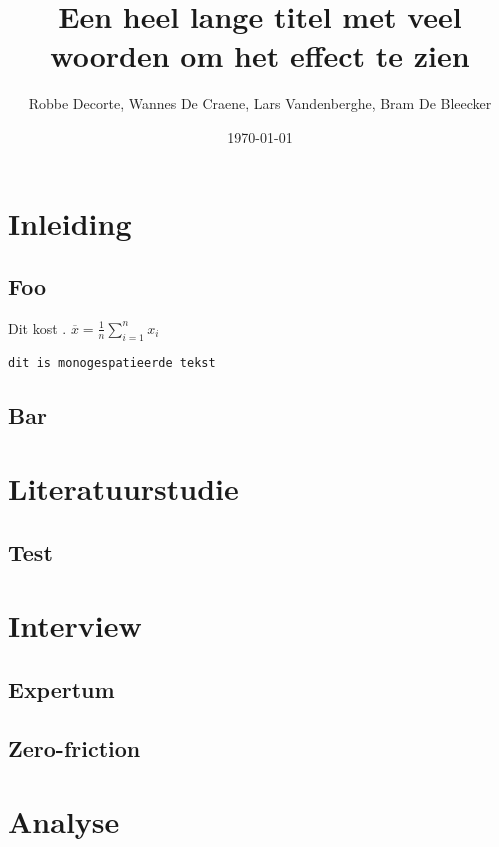 \documentclass{hogent-report}
\title{Een heel lange titel met veel woorden om het effect te zien}
\author{Robbe Decorte, Wannes {De Craene}, Lars Vandenberghe, Bram {De Bleecker}}
\date{\today}
\begin{document}
  \inserttitlepage[hgblue]
  
  \usechapterimagefalse

  \tableofcontents
  
  \chapter{Inleiding}
  
  \lipsum[1]
  
  \section{Foo}
  
  Dit kost . $\overline{x} = \frac{1}{n} \sum_{i = 1}^{n} x_i$
  
  \texttt{dit is monogespatieerde tekst}
  
  \lipsum[2-3]
  
  \section{Bar}
  
  \lipsum[4-6]
  
  \chapter{Literatuurstudie}
  
  \lipsum[7]
  
  \section{Test}
  
  \lipsum[8-10]
  
  \chapter{Interview}
  
  \section{Expertum}
  
  \section{Zero-friction}
  
  \lipsum[11-15]
  
  \chapter{Analyse}
  
\end{document}
